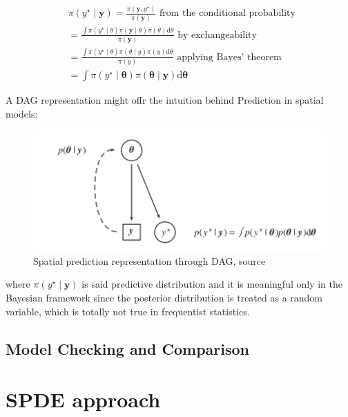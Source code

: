 \documentclass[
  12pt,
  a4paper,
  oneside]{book}
\begin{document}
\[
\begin{aligned}
&\pi\left(y^{\star} \mid \boldsymbol{y}\right)=\frac{\pi\left(\boldsymbol{y}, y^{\star}\right)}{\pi(\boldsymbol{y})} \text { from the conditional probability }\\
&=\frac{\int \pi\left(y^{\star} \mid \theta\right) \pi(\boldsymbol{y} \mid \theta) \pi(\theta) \mathrm{d} \theta}{\pi(\boldsymbol{y})} \text { by exchangeability }\\
&=\frac{\int \pi\left(y^{\star} \mid \theta\right) \pi(\theta \mid y) \pi(y) \mathrm{d} \theta}{\pi(y)} \text { applying Bayes' theorem }\\
&=\int \pi\left(y^{\star} \mid \boldsymbol{\theta}\right) \pi(\boldsymbol{\theta} \mid \boldsymbol{y}) \mathrm{d} \boldsymbol{\theta}
\end{aligned}
\]

A DAG representation might offr the intuition behind Prediction in spatial models:

\begin{figure}
\centering
\includegraphics{images/spatial_prediction.jpg}
\caption{Spatial prediction representation through DAG, source \citet{Blangiardo-Cameletti}}
\end{figure}

where \(\pi\left(y^{\star} \mid \boldsymbol{y}\right)\) is said predictive distribution and it is meaningful only in the Bayesian framework since the posterior distribution is treated as a random variable, which is totally not true in frequentist statistics.

\hypertarget{model-checking-and-comparison}{%
\section{Model Checking and Comparison}\label{model-checking-and-comparison}}

\hypertarget{spde}{%
\chapter{SPDE approach}\label{spde}}
\end{document}
